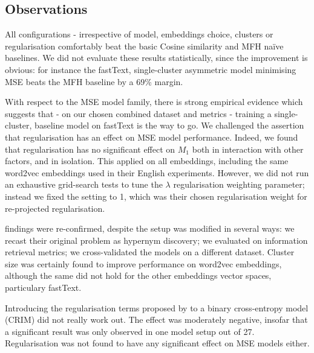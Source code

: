 \subsection{Observations}

All configurations - irrespective of model, embeddings choice, clusters or regularisation comfortably beat the basic Cosine similarity and \ac{MFH} na\"ive baselines.  We did not evaluate these results statistically, since the improvement is obvious: for instance the fastText, single-cluster asymmetric model minimising \ac{MSE} beats the \ac{MFH} baseline by a 69\% margin.

With respect to the \ac{MSE} model family, there is strong empirical evidence which suggests that - on our chosen combined dataset and metrics - training a single-cluster, baseline model on fastText is the way to go.  We challenged the \citet{ustalov2017negative} assertion that regularisation has an effect on \ac{MSE} model performance.  Indeed, we found that regularisation has no significant effect on $M_1$ both in interaction with other factors, and in isolation.  This applied on all embeddings, including the same word2vec embeddings \citeauthor{ustalov2017negative} used in their English experiments.  However, we did not run an exhaustive grid-search tests to tune the $\lambda$ regularisation weighting parameter; instead we fixed the setting to 1, which was their chosen regularisation weight for re-projected regularisation.

\citet{Fu2014} findings were re-confirmed, despite the setup was modified in several ways: we recast their original problem as hypernym discovery; we evaluated on information retrieval metrics; we cross-validated the models on a different dataset.  Cluster size was certainly found to improve performance on word2vec embeddings, although the same did not hold for the other embeddings vector spaces, particulary fastText.

Introducing the regularisation terms proposed by \citet{ustalov2017negative} to a binary cross-entropy model (CRIM) did not really work out.  The effect was moderately negative, insofar that a significant result was only observed in one model setup out of 27.  Regularisation was not found to have any significant effect on \ac{MSE} models either.  

